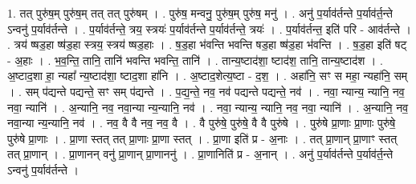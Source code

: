 \documentclass[17pt]{extarticle}
\begin{document}
1. तत् पुरु॑ष॒म् पुरु॑ष॒म् तत् तत् पुरु॑षम् । . पुरु॑ष॒ मन्वनु॒ पुरु॑ष॒म् पुरु॑ष॒ मनु॑ । . अनु॑ प॒र्याव॑र्तन्ते प॒र्याव॑र्त॒न्ते ऽन्वनु॑ प॒र्याव॑र्तन्ते । . प॒र्याव॑र्तन्ते॒ त्रय॒ स्त्रयः॑ प॒र्याव॑र्तन्ते प॒र्याव॑र्तन्ते॒ त्रयः॑ । . प॒र्याव॑र्तन्त॒ इति॑ परि - आव॑र्तन्ते । . त्रय॑ ष्षड॒हा ष्ष॑ड॒हा स्त्रय॒ स्त्रय॑ ष्षड॒हाः । . ष॒ड॒हा भ॑वन्ति भवन्ति षड॒हा ष्ष॑ड॒हा भ॑वन्ति । . ष॒ड॒हा इति॑ षट् - अ॒हाः । . भ॒व॒न्ति॒ तानि॒ तानि॑ भवन्ति भवन्ति॒ तानि॑ । . तान्य॒ष्टाद॑शा॒ ष्टाद॑श॒ तानि॒ तान्य॒ष्टाद॑श । . अ॒ष्टाद॒शा हा॒ न्यहा᳚ न्य॒ष्टाद॑शा॒ ष्टाद॒शा हा॑नि । . अ॒ष्टाद॒शेत्य॒ष्टा - द॒श॒ । . अहा॑नि॒ सꣳ स महा॒ न्यहा॑नि॒ सम् । . सम् प॑द्यन्ते पद्यन्ते॒ सꣳ सम् प॑द्यन्ते । . प॒द्य॒न्ते॒ नव॒ नव॑ पद्यन्ते पद्यन्ते॒ नव॑ । . नवा॒ न्यान्य॒ न्यानि॒ नव॒ नवा॒ न्यानि॑ । . अ॒न्यानि॒ नव॒ नवा॒न्या न्य॒न्यानि॒ नव॑ । . नवा॒ न्यान्य॒ न्यानि॒ नव॒ नवा॒ न्यानि॑ । . अ॒न्यानि॒ नव॒ नवा॒न्या न्य॒न्यानि॒ नव॑ । . नव॒ वै वै नव॒ नव॒ वै । . वै पुरु॑षे॒ पुरु॑षे॒ वै वै पुरु॑षे । . पुरु॑षे प्रा॒णाः प्रा॒णाः पुरु॑षे॒ पुरु॑षे प्रा॒णाः । . प्रा॒णा स्तत् तत् प्रा॒णाः प्रा॒णा स्तत् । . प्रा॒णा इति॑ प्र - अ॒नाः । . तत् प्रा॒णान् प्रा॒णाꣳ स्तत् तत् प्रा॒णान् । . प्रा॒णानन् वनु॑ प्रा॒णान् प्रा॒णाननु॑ । . प्रा॒णानिति॑ प्र - अ॒नान् । . अनु॑ प॒र्याव॑र्तन्ते प॒र्याव॑र्त॒न्ते ऽन्वनु॑ प॒र्याव॑र्तन्ते । \newline
\end{document}
